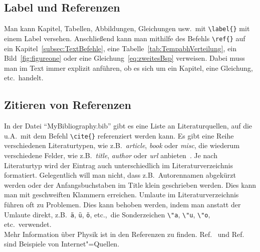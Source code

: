 \subsection{Label und Referenzen}
\label{subsec:labelref}
Man kann Kapitel, Tabellen, Abbildungen, Gleichungen usw.\ mit \verb"\label{}" mit einem Label versehen. Anschließend kann man mithilfe des Befehls \verb"\ref{}" auf ein Kapitel~\ref{subsec:TextBefehle}, eine Tabelle~\ref{tab:TempabhVerteilung}, ein Bild~\ref{fig:figureone} oder eine Gleichung~\ref{eq:zweitesBsp} verweisen. Dabei muss man im Text immer explizit anführen, ob es sich um ein Kapitel, eine Gleichung, etc.\ handelt. %
%
\subsection{Zitieren von Referenzen}
\label{subsec:ZitRef}
In der Datei "`MyBibliography.bib"' gibt es eine Liste an Literaturquellen, auf die u.A.\ mit dem Befehl \verb"\cite{}" referenziert werden kann. Es gibt eine Reihe verschiedenen Literaturtypen, wie z.B.\ \textit{article}, \textit{book} oder \textit{misc}, die wiederum verschiedene Felder, wie z.B.\ \textit{title}, \textit{author} oder \textit{url} anbieten~\cite{biblatexManual}. Je nach Literaturtyp wird der Eintrag auch unterschiedlich im Literaturverzeichnis formatiert. Gelegentlich will man nicht, dass z.B.\ Autorennamen abgekürzt werden oder der Anfangsbuchstaben im Title klein geschrieben werden. Dies kann man mit geschweiften Klammern erreichen. Umlaute im Literaturverzeichnis führen oft zu Problemen. Dies kann behoben werden, indem man anstatt der Umlaute direkt, z.B.\ \verb+ä+, \verb+ü+, \verb+ö+, etc.,\ die Sonderzeichen \verb+\"a+, \verb+\"u+, \verb+\"o+, etc.\ verwendet.\\
Mehr Information \"uber Physik ist in den Referenzen \cite{Demtroeder3,PhysRev.47.777} zu finden. Ref.~\cite{Internetquelle1} und Ref.~\cite{Internetquelle2} sind Beispiele von Internet"=Quellen.
%
